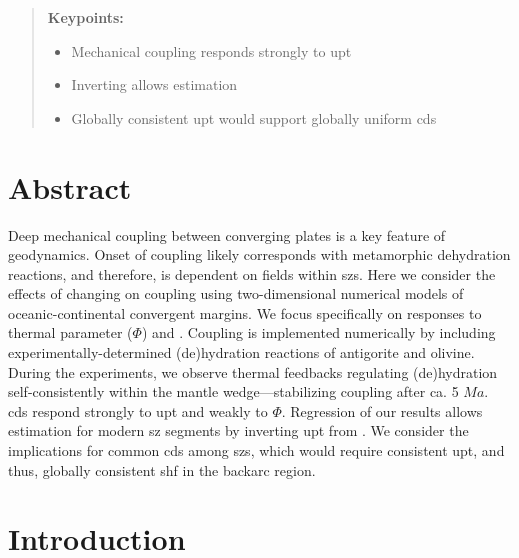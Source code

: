 
\begin{quote}
\textbf{Keypoints:}

\begin{itemize}
\item
  Mechanical coupling responds strongly to \gls{upt}
\item
  Inverting  allows  estimation
\item
  Globally consistent \gls{upt} would support globally uniform \glspl{cd}
\end{itemize}
\end{quote}

\hypertarget{abstract}{%
\section{Abstract}\label{abstract}}

Deep mechanical coupling between converging plates is a key feature of  geodynamics. Onset of coupling likely corresponds with metamorphic dehydration reactions, and therefore, is dependent on  fields within \glspl{sz}. Here we consider the effects of changing  on coupling using two-dimensional numerical models of oceanic-continental convergent margins. We focus specifically on responses to thermal parameter (\(\Phi\)) and . Coupling is implemented numerically by including experimentally-determined (de)hydration reactions of antigorite and olivine. During the experiments, we observe thermal feedbacks regulating (de)hydration self-consistently within the mantle wedge---stabilizing coupling after ca. 5 \(Ma\). \glspl{cd} respond strongly to \gls{upt} and weakly to \(\Phi\). Regression of our results allows  estimation for modern \gls{sz} segments by inverting \gls{upt} from . We consider the implications for common \glspl{cd} among \glspl{sz}, which would require consistent \gls{upt}, and thus, globally consistent \gls{shf} in the backarc region.

\hypertarget{introduction-1}{%
\section{Introduction}\label{introduction-1}}

